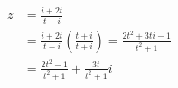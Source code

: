 \documentclass[preview]{standalone}
\begin{document}
\begin{align*}
z &= \frac{i + 2t}{t - i} \\ &= \frac{i + 2t}{t - i}\left(\frac{t+i}{t+i}\right) = \frac{2t^2 + 3ti - 1}{t^2 + 1} \\ &= \frac{2t^2 - 1}{t^2 + 1} + \frac{3t}{t^2 + 1}i
\end{align*}
\end{document}
